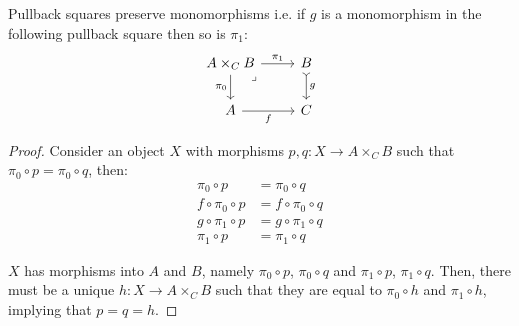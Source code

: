 \begin{theorem}
  Pullback squares preserve monomorphisms i.e. if $g$ is a monomorphism in the
  following pullback square then so is $\pi_1$:
  \[\begin{tikzcd}[ampersand replacement=\&]
    {A\times_CB} \& B \\
    A \& C
    \arrow["g", tail, from=1-2, to=2-2]
    \arrow["f"', from=2-1, to=2-2]
    \arrow["{\pi_0}"', from=1-1, to=2-1]
    \arrow["{\pi_1}", from=1-1, to=1-2]
    \arrow["\lrcorner"{anchor=center, pos=0.125}, draw=none, from=1-1, to=2-2]
  \end{tikzcd}\]

  \begin{proof}
    Consider an object $X$ with morphisms $p, q: X\to A\times_C B$ such that
    $\pi_0 \circ p = \pi_0 \circ q$, then:
    \[
      \begin{aligned}
        \pi_0 \circ p &= \pi_0 \circ q\\
        f \circ \pi_0 \circ p &= f \circ \pi_0 \circ q\\
        g \circ \pi_1 \circ p &= g \circ \pi_1 \circ q\\
        \pi_1 \circ p &= \pi_1 \circ q
      \end{aligned}
    \]

    $X$ has morphisms into $A$ and $B$, namely $\pi_0 \circ p$, $\pi_0 \circ q$
    and $\pi_1 \circ p$, $\pi_1 \circ q$. Then, there must be a unique $h: X\to
    A\times_C B$ such that they are equal to $\pi_0 \circ h$ and $\pi_1 \circ
    h$, implying that $p=q=h$.
  \end{proof}
\end{theorem}

